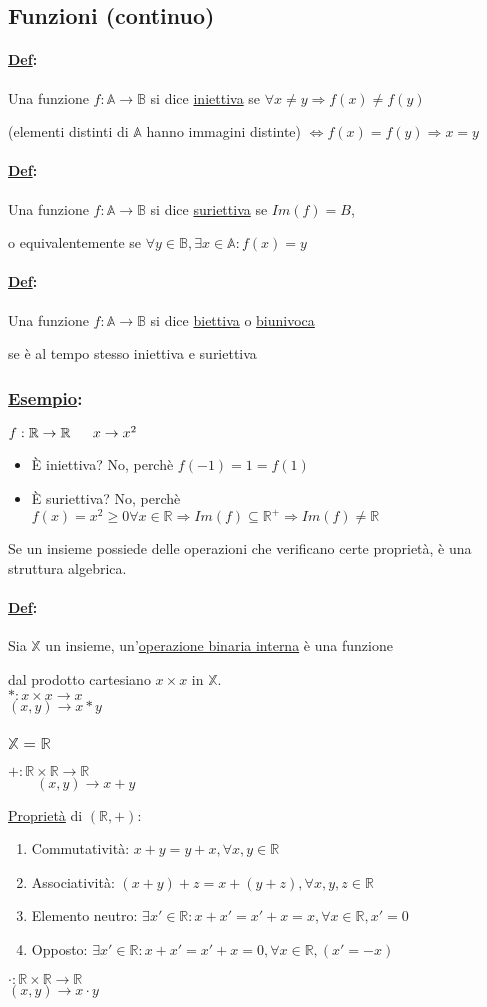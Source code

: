 \documentclass{article}
\newcommand{\ul}[1]{\underline{#1}}
\newcommand{\A}{\mathbb{A}}
\newcommand{\B}{\mathbb{B}}
\newcommand{\R}{\mathbb{R}}
\newcommand{\Def}[2]{\paragraph{\ul{Def}:}#1\\\hspace*{3em}\begin{minipage}{.8\textwidth}#2\end{minipage}}
\newcommand{\Esempio}[1]{\subsubsection*{\ul{Esempio}:}#1}
\begin{document}
\subsection{Funzioni (continuo)}
\Def{Una funzione $f:\A\rightarrow\B$ si dice \ul{iniettiva} se $\forall x\not=y\Rightarrow f(x)\not=f(y)$}{(elementi distinti di $\A$ hanno immagini distinte) $\Leftrightarrow f(x)=f(y)\Rightarrow x=y$}
\Def{Una funzione $f:\A\rightarrow\B$ si dice \ul{suriettiva} se $Im(f)=B$,}{o equivalentemente se $\forall y\in\B,\exists x\in\A:f(x)=y$}
\Def{Una funzione $f:\A\rightarrow\B$ si dice \ul{biettiva} o \ul{biunivoca}}{se è al tempo stesso iniettiva e suriettiva}
\Esempio{$f:\R\rightarrow\R\\\hspace*{1.6em}x\rightarrow x^2$
	\begin{itemize}
		\item È iniettiva? No, perchè $f(-1)=1=f(1)$
		\item È suriettiva? No, perchè $f(x)=x^2\geq0\forall x\in\R\Rightarrow Im(f)\subseteq\R^+\Rightarrow Im(f)\not=\R$
	\end{itemize}}
\vspace*{1em}
\par Se un insieme possiede delle operazioni che verificano certe proprietà, è una struttura algebrica.
\Def{Sia $\mathbb{X}$ un insieme, un'\ul{operazione binaria interna} è una funzione}{dal prodotto cartesiano $x\times x$ in $\mathbb{X}$.\\$*:x\times x \rightarrow x$\\\hspace*{1.4em}$(x,y)\rightarrow x*y$}
\subsubsection*{$\mathbb{X}=\R$}
$+:\R\times\R\rightarrow\R$\\
\hspace*{0em}$\qquad(x,y)\rightarrow x+y$

\ul{Proprietà} di $(\R,+)$:
\begin{enumerate}
	\item Commutatività: $x+y=y+x,\forall x,y\in\R$
	\item Associatività: $(x+y)+z=x+(y+z),\forall x,y,z\in\R$
	\item Elemento neutro: $\exists x'\in\R:x+x'=x'+x=x,\forall x\in\R,x'=0$
	\item Opposto: $\exists x'\in\R:x+x'=x'+x=0,\forall x\in\R,(x'=-x)$
\end{enumerate}
\par$\cdot:\R\times\R\rightarrow\R$\\
\hspace*{1.5em}$(x,y)\rightarrow x\cdot y$
\end{document}
